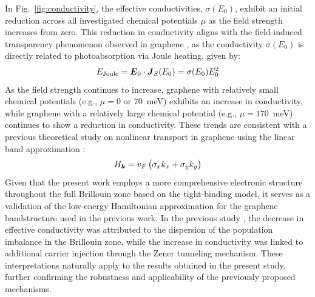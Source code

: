 In Fig.~\ref{fig:conductivity}, the effective conductivities, $\sigma(E_0)$, exhibit an initial
reduction across all investigated chemical potentials $\mu$ as the field strength increases from
zero. This reduction in conductivity aligns with the field-induced transparency phenomenon observed
in graphene \cite{sato2021nonlinear}, as the conductivity $\sigma(E_0)$ is directly related to
photoabsorption via Joule heating, given by:
\begin{align}
    E_{\mathrm{Joule}}=\boldsymbol E_0 \cdot \boldsymbol J_S(E_0)=\sigma(E_0)E^2_0
\end{align}
    As the field strength continues to increase, graphene with relatively small chemical potentials (e.g., $\mu=0$ or $70$~meV) exhibits an increase in conductivity, while graphene with a relatively large chemical potential (e.g., $\mu=170$~meV) continues to show a reduction in conductivity. These trends are consistent with a previous theoretical study on nonlinear transport in graphene using the linear band approximation \cite{sato2021nonlinear}:
    \begin{align}
H_{\boldsymbol k}=v_F\left (\sigma_x k_x +\sigma_y k_y \right)
\end{align}
Given that the present work employs a more comprehensive electronic structure throughout the full Brillouin zone based on the tight-binding model, it serves as a validation of the low-energy Hamiltonian approximation for the graphene bandstructure used in the previous work. In the previous study \cite{sato2021nonlinear}, the decrease in effective conductivity was attributed to the dispersion of the population imbalance in the Brillouin zone, while the increase in conductivity was linked to additional carrier injection through the Zener tunneling mechanism. These interpretations naturally apply to the results obtained in the present study, further confirming the robustness and applicability of the previously proposed mechanisms.
